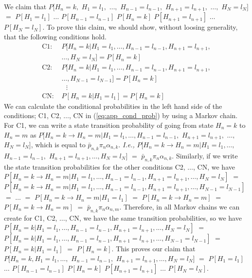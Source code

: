 \documentclass[conference]{IEEEtran}
\newcommand{\Ie}{{\em I.e., }}
\begin{document}
We claim that $P[H_{n}=k,$  $H_{1}=l_{1},$ $\ldots,$ $H_{n-1}=l_{n-1},$ $H_{n+1}=l_{n+1},$ $\ldots,$  $H_{N}=l_{N}]$ $=$ $P[H_1=l_1]$ $\ldots$ $P[H_{n-1}=l_{n-1}]$ $P[H_n=k]$ $P[H_{n+1}=l_{n+1}]$ $\ldots$ $P[H_{N}=l_{N}]$. To prove this claim, we should show, without loosing generality, that the following conditions hold. 
\begin{align} \label{eq:app_cond_prob}
\mbox{C1: }  & P[H_{n}=k | H_1=l_1, \ldots, H_{n-1}=l_{n-1}, H_{n+1}=l_{n+1}, \nonumber \\
& \ldots, H_{N}=l_{N}] = P[H_{n}=k]  \nonumber \\ 
\mbox{C2: } & P[H_{n}=k | H_1=l_1, \ldots, H_{n-1}=l_{n-1}, H_{n+1}=l_{n+1}, \nonumber \\
& \ldots, H_{N-1}=l_{N-1}] = P[H_{n}=k]  \nonumber  \\ 
& \mbox{                } \vdots \nonumber \\
\mbox{CN: }  & P[H_{n}=k | H_1=l_1] = P[H_{n}=k] 
\end{align} We can calculate the conditional probabilities in the left hand side of the conditions; C1, C2, $\ldots$, CN in (\ref{eq:app_cond_prob}) by using a Markov chain. For C1, we can write a state transition probability of going from state $H_{n} = k$ to $H_{n}=m$ as $P[H_{n}=k \rightarrow H_{n}=m | H_1=l_1, \ldots, H_{n-1}=l_{n-1},$ $H_{n+1}=l_{n+1},$ $\ldots,$ $H_{N}=l_{N}]$, which is equal to $\bar{p}_{n,k} \pi_{n} \alpha_{n,k}$. \Ie $P[H_{n}=k \rightarrow H_{n}=m | H_1=l_1, \ldots,$ $H_{n-1}=l_{n-1},$ $H_{n+1}=l_{n+1}, \ldots, H_{N}=l_{N}]$ $=$ $\bar{p}_{n,k} \pi_{n} \alpha_{n,k}$. Similarly, if we write the state transition probabilities for the other conditions C2, $\ldots$, CN, we have $P[H_{n}=k \rightarrow H_{n}=m | H_1=l_1, \ldots, H_{n-1}=l_{n-1}, H_{n+1}=l_{n+1}, \ldots, H_{N}=l_{N}]$ $=$ $P[H_{n}=k \rightarrow H_{n}=m | H_1=l_1, \ldots, H_{n-1}=l_{n-1}, H_{n+1}=l_{n+1}, \ldots, H_{N-1}=l_{N-1}]$ $=$ $\ldots$ $=$ $P[H_{n}=k \rightarrow H_{n}=m | H_1=l_1]$ $=$ $P[H_{n}=k \rightarrow H_{n}=m]$ $=$ $P[H_{n}=k \rightarrow H_{n}=m]$ $=$ $\bar{p}_{n,k}\pi_{n}\alpha_{n,m}$. Therefore, in all Markov chains we can create for C1, C2, $\ldots$, CN, we have the same transition probabilities, so we have $P[H_{n}=k | H_1=l_1, \ldots, H_{n-1}=l_{n-1}, H_{n+1}=l_{n+1}, \ldots, H_{N}=l_{N}]$ $=$ $P[H_{n}=k | H_1=l_1, \ldots, H_{n-1}=l_{n-1}, H_{n+1}=l_{n+1}, \ldots, H_{N-1}=l_{N-1}]$ $=$ $P[H_{n}=k | H_1=l_1]$ $=$ $P[H_{n}=k]$. This proves our claim that $P[H_{n}=k,  H_{1}=l_{1}, \ldots,$ $H_{n-1}=l_{n-1},$ $H_{n+1}=l_{n+1}, \ldots,  H_{N}=l_{N}]$ $=$ $P[H_1=l_1]$ $\ldots$ $P[H_{n-1}=l_{n-1}]$ $P[H_n=k]$ $P[H_{n+1}=l_{n+1}]$ $\ldots$ $P[H_{N}=l_{N}]$. 
\end{document}
